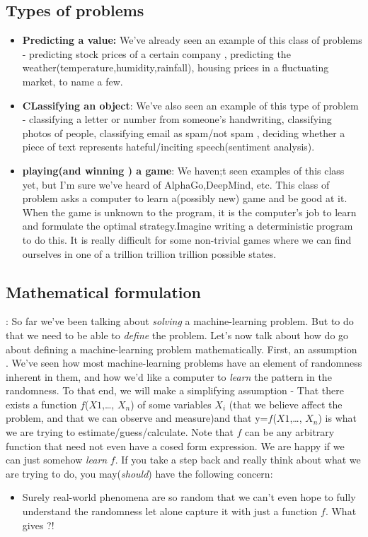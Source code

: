 \documentclass[]{article}
\begin{document}
\begin{itemize}
\begin{itemize}
			\subsection{Types of problems}
			\begin{itemize}
				\item \textbf{Predicting a value:} We've already seen an example of this class of problems - predicting stock prices of a certain company , predicting the weather(temperature,humidity,rainfall), housing prices in a fluctuating market, to name a few.
				\item \textbf{CLassifying an object}: We've also seen an example of this type of problem - classifying a letter or number from someone's handwriting, classifying photos of people, classifying email as spam/not spam , deciding whether a piece of text represents hateful/inciting speech(sentiment analysis). 
				\item \textbf{playing(and winning ) a game}: We haven;t seen examples of this class yet, but I'm sure we've heard of AlphaGo,DeepMind, etc. This class of problem asks a computer to learn a(possibly new) game and be good at it. When the game is unknown to the program, it is the computer's job to learn and formulate the optimal strategy.Imagine writing a deterministic program to do this. It is really difficult for some non-trivial games where we can find ourselves in one of a trillion trillion trillion possible states.
			\end{itemize}
			\subsection{Mathematical formulation}:
			So far we've been talking about \textit{solving} a machine-learning problem. But to do that we need to be able to \textit{define} the problem. Let's now talk about how do go about defining a machine-learning problem mathematically.
			First, an assumption . We've seen how most machine-learning problems have an element of randomness inherent in them, and how we'd like a computer to \textit{learn} the pattern in the randomness. To that end, we will make a simplifying assumption - That there exists a function $f$($X1$,\ldots, $X_n$) of some variables $X_i$ (that we believe affect the problem, and that we can observe and measure)and that y=$f$($X1$,\ldots, $X_n$) is what we are trying to estimate/guess/calculate. Note that $f$ can be any arbitrary function that need not even have a cosed form expression. We are happy if we can just somehow \textit{learn} $f$. If you take a step back and really think about what we are trying to do, you may(\textit{should}) have the following concern:
			\begin{itemize}
				\item Surely real-world phenomena are so random that we can't even hope to fully understand the randomness let alone capture it with just a function $f$. What gives ?!
				

\end{itemize}
\end{itemize}
\end{itemize}
\end{document}
